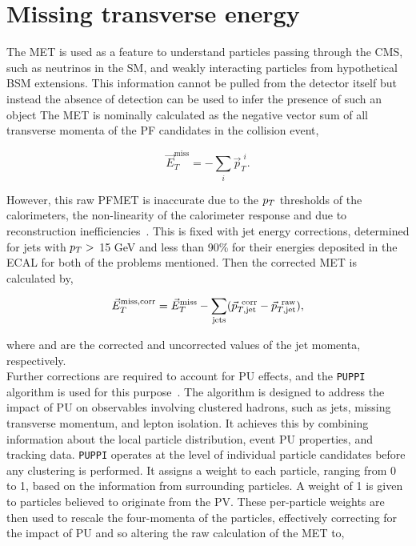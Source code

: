 \section{Missing transverse energy}

The \ac{MET} is used as a feature to understand particles passing through the \ac{CMS}, such as neutrinos in the \ac{SM}, and weakly interacting particles from hypothetical \ac{BSM} extensions.
This information cannot be pulled from the detector itself but instead the absence of detection can be used to infer the presence of such an object
The \ac{MET} is nominally calculated as the negative vector sum of all transverse momenta of the \ac{PF} candidates in the collision event,

\begin{equation}
\vec{E}_{T}^{\text{miss}} = - \sum_{i} \vec{p}_{T}^{\hspace{4pt}i}.
\end{equation}

However, this raw \ac{PF}\ac{MET} is inaccurate due to the $p_{T}$ thresholds of the calorimeters, the non-linearity of the calorimeter response and due to reconstruction inefficiencies~\cite{CMS:2016ljj}.
This is fixed with jet energy corrections, determined for jets with $p_{T}>$ 15 GeV and less than 90\% for their energies deposited in the \ac{ECAL} for both of the problems mentioned. 
Then the corrected \ac{MET} is calculated by,

\begin{equation}
\vec{E}_{T}^{\text{miss,corr}} = \vec{E}_{T}^{\text{miss}} - \sum_{\text{jets}} (\vec{p}_{T,\text{jet}}^{\text{\hspace{4pt}corr}} - \vec{p}_{T,\text{jet}}^{\text{\hspace{4pt}raw}}),
\end{equation}

where  and  are the corrected and uncorrected values of the jet momenta, respectively. \\

Further corrections are required to account for \ac{PU} effects, and the \texttt{PUPPI} algorithm is used for this purpose~\cite{CMS:2020ebo}.
The algorithm is designed to address the impact of \ac{PU} on observables involving clustered hadrons, such as jets, missing transverse momentum, and lepton isolation. 
It achieves this by combining information about the local particle distribution, event \ac{PU} properties, and tracking data. 
\texttt{PUPPI} operates at the level of individual particle candidates before any clustering is performed. 
It assigns a weight to each particle, ranging from 0 to 1, based on the information from surrounding particles. 
A weight of 1 is given to particles believed to originate from the \ac{PV}. 
These per-particle weights are then used to rescale the four-momenta of the particles, effectively correcting for the impact of \ac{PU} and so altering the raw calculation of the \ac{MET} to,

